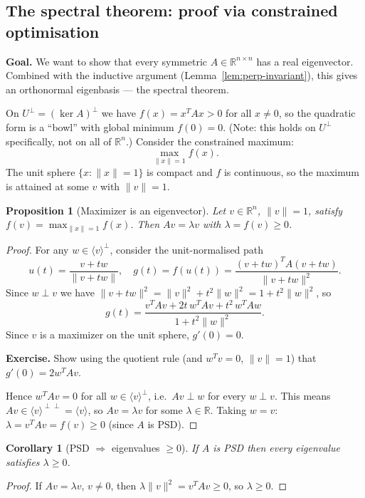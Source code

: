 \documentclass[11pt]{article}
\theoremstyle{definition}
\theoremstyle{plain}
\newtheorem{proposition}{Proposition}[section]
\newtheorem{corollary}{Corollary}[section]
\begin{document}

\subsection{The spectral theorem: proof via constrained optimisation}

\textbf{Goal.}  We want to show that every symmetric $A\in\mathbb{R}^{n\times n}$
has a real eigenvector.  Combined with the inductive argument
(Lemma~\ref{lem:perp-invariant}), this gives an orthonormal eigenbasis ---
the spectral theorem.

\medskip\noindent
On $U^\perp = (\ker A)^\perp$ we have $f(x) = x^TAx > 0$ for all $x\ne 0$,
so the quadratic form is a ``bowl'' with global minimum $f(0) = 0$.
(Note: this holds on $U^\perp$ specifically, not on all of $\mathbb{R}^n$.)
Consider the constrained maximum:
\[
  \max_{\|x\|=1} f(x).
\]
The unit sphere $\{x : \|x\|=1\}$ is compact and $f$ is continuous,
so the maximum is attained at some $v$ with $\|v\|=1$.

\begin{proposition}[Maximizer is an eigenvector]
  Let $v\in\mathbb{R}^n$, $\|v\|=1$, satisfy
  $f(v) = \max_{\|x\|=1} f(x)$.
  Then $Av = \lambda v$ with $\lambda = f(v) \ge 0$.
\end{proposition}
\begin{proof}
  For any $w\in\langle v\rangle^\perp$, consider the unit-normalised path
  \[
    u(t) = \frac{v + tw}{\|v + tw\|}, \quad
    g(t) = f(u(t)) = \frac{(v+tw)^T A(v+tw)}{\|v+tw\|^2}.
  \]
  Since $w \perp v$ we have $\|v+tw\|^2 = \|v\|^2 + t^2\|w\|^2 = 1 + t^2\|w\|^2$, so
  \[
    g(t) = \frac{v^TAv + 2t\,w^TAv + t^2\,w^TAw}{1 + t^2\|w\|^2}.
  \]
  Since $v$ is a maximizer on the unit sphere, $g'(0) = 0$.

  \textbf{Exercise.}  Show using the quotient rule (and $w^Tv = 0$, $\|v\|=1$)
  that $g'(0) = 2w^TAv$.

  Hence $w^TAv = 0$ for all $w\in\langle v\rangle^\perp$, i.e.\
  $Av \perp w$ for every $w\perp v$.  This means
  $Av \in \langle v\rangle^{\perp\perp} = \langle v\rangle$,
  so $Av = \lambda v$ for some $\lambda\in\mathbb{R}$.
  Taking $w = v$: $\lambda = v^TAv = f(v) \ge 0$ (since $A$ is PSD).
\end{proof}


\begin{corollary}[PSD $\Rightarrow$ eigenvalues $\ge 0$]
  If $A$ is PSD then every eigenvalue satisfies $\lambda \ge 0$.
\end{corollary}
\begin{proof}
  If $Av = \lambda v$, $v\ne 0$, then
  $\lambda \|v\|^2 = v^TAv \ge 0$, so $\lambda \ge 0$.
\end{proof}
\end{document}
